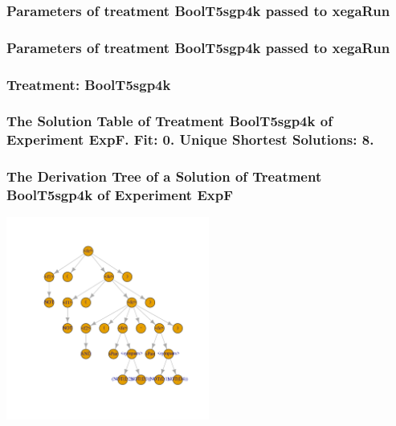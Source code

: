 \documentclass[18pt,c]{beamer}
\begin{document}

 \begin{frame}
 \fontsize{8pt}{9pt}\selectfont
 \frametitle{  Parameters of treatment BoolT5sgp4k passed to xegaRun
 }

 \label{ExpFtParmTable022.tex}  
 \end{frame}


 \begin{frame}
 \fontsize{8pt}{9pt}\selectfont
 \frametitle{  Parameters of treatment BoolT5sgp4k passed to xegaRun
 }

 \label{ExpFtParmTable023.tex}  
 \end{frame}

 \begin{frame}
 \fontsize{8pt}{9pt}\selectfont
 \frametitle{ Treatment: BoolT5sgp4k }

 \label{ExpFStatsTable011.tex}  
 \end{frame}

 \begin{frame}
 \fontsize{8pt}{9pt}\selectfont
 \frametitle{ The Solution Table of Treatment BoolT5sgp4k of Experiment ExpF. Fit: 0. Unique Shortest Solutions: 8. }

 \label{ExpFSolutionTable005.tex}  
 \end{frame}

 \begin{frame}
 \frametitle{ The Derivation Tree of a Solution of Treatment BoolT5sgp4k of Experiment ExpF }
 \begin{center}
\includegraphics[width=0.5\textwidth, angle=0]
{ExpFDerivationTreeFigure005.pdf}
 \end{center}
 \label{report/ExpFDerivationTreeFigure005.pdf}  
 \end{frame}
\end{document}
